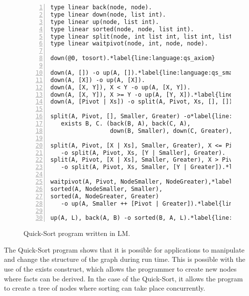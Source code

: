 \begin{figure}[h!]
\begin{Verbatim}[numbers=left,fontsize=\codesize,commandchars=\*\{\}]
type linear back(node, node).
type linear down(node, list int).
type linear up(node, list int).
type linear sorted(node, node, list int).
type linear split(node, int list int, list int, list int).
type linear waitpivot(node, int, node, node).

down(@0, tosort).*label{line:language:qs_axiom}

down(A, []) -o up(A, []).*label{line:language:qs_small1}
down(A, [X]) -o up(A, [X]).
down(A, [X, Y]), X < Y -o up(A, [X, Y]).
down(A, [X, Y]), X >= Y -o up(A, [Y, X]).*label{line:language:qs_small2}
down(A, [Pivot | Xs]) -o split(A, Pivot, Xs, [], []).*label{line:language:qs_complex}

split(A, Pivot, [], Smaller, Greater) -o*label{line:language:qs_exists1}
   exists B, C. (back(B, A), back(C, A),
                 down(B, Smaller), down(C, Greater), waitpivot(A, Pivot, B, C)).*label{line:language:qs_exists2}

split(A, Pivot, [X | Xs], Smaller, Greater), X <= Pivot*label{line:language:qs_split1}
   -o split(A, Pivot, Xs, [Y | Smaller], Greater).
split(A, Pivot, [X | Xs], Smaller, Greater), X > Pivot
   -o split(A, Pivot, Xs, Smaller, [Y | Greater]).*label{line:language:qs_split2}
   
waitpivot(A, Pivot, NodeSmaller, NodeGreater),*label{line:language:qs_sorted1}
sorted(A, NodeSmaller, Smaller),
sorted(A, NodeGreater, Greater)
   -o up(A, Smaller ++ [Pivot | Greater]).*label{line:language:qs_sorted2}*label{line:language:qs_up} // Append the lists.

up(A, L), back(A, B) -o sorted(B, A, L).*label{line:language:qs_back}
\end{Verbatim}
  \caption{Quick-Sort program written in LM.}
  \label{language:code:quicksort}
\end{figure}

The Quick-Sort program shows that it is possible for applications to manipulate
and change the structure of the graph during run time. This is possible with the
use of the exists construct, which allows the programmer to create new nodes
where facts can be derived. In the case of the Quick-Sort, it allows the program
to create a tree of nodes where sorting can take place concurrently.

